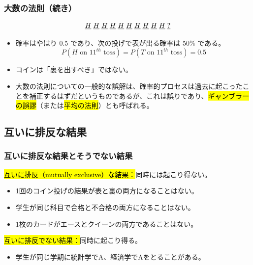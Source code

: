
\begin{frame}[shrink=15]
\frametitle{大数の法則（続き）}


\[ \underline{H} \hspace{1mm} \underline{H} \hspace{1mm} \underline{H} \hspace{1mm} \underline{H} \hspace{1mm} \underline{H} \hspace{1mm} \underline{H} \hspace{1mm} \underline{H} \hspace{1mm} \underline{H} \hspace{1mm} \underline{H} \hspace{1mm} \underline{H} \hspace{1mm} \underline{?} \]

\begin{itemize}
\item 確率はやはり 0.5 であり、次の投げで表が出る確率は 50\% である。
\[ P(H \text{ on 11}^{th} \text{ toss}) = P(T \text{ on 11}^{th} \text{ toss}) = 0.5 \]
\item コインは「裏を出すべき」ではない。
\item 大数の法則についての一般的な誤解は、確率的プロセスは過去に起こったことを補正するはずだというものであるが、これは誤りであり、\hl{ギャンブラーの誤謬}（または\hl{平均の法則}）とも呼ばれる。
\end{itemize}

\end{frame}


\subsection{互いに排反な結果}


\begin{frame}[shrink=10]
\frametitle{互いに排反な結果とそうでない結果}

\hl{互いに排反（mutually exclusive）な結果：}同時には起こり得ない。
\begin{itemize}
\item 1回のコイン投げの結果が表と裏の両方になることはない。
\item 学生が同じ科目で合格と不合格の両方になることはない。
\item 1枚のカードがエースとクイーンの両方であることはない。
\end{itemize}

\hl{互いに排反でない結果：}同時に起こり得る。
\begin{itemize}
\item 学生が同じ学期に統計学でA、経済学でAをとることがある。
\end{itemize}

\end{frame}

